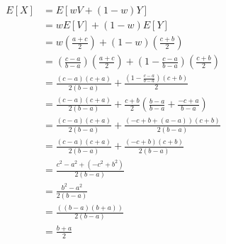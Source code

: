 \documentclass{article}
\begin{document}
\begin{enumerate}[label=\alph*)]
\begin{align*}
    E[X] &= E[wV + (1-w)Y] \\
    &= wE[V] + (1-w)E[Y] \\
    &= w\left(\frac{a + c}{2}\right) + (1-w)\left(\frac{c + b}{2}\right) \\
    &= \left(\frac{c-a}{b-a}\right) \left(\frac{a + c}{2}\right) + \left(1 - \frac{c-a}{b-a}\right) \left(\frac{c + b}{2}\right) \\
    &= \frac{(c - a)(c + a)}{2(b - a)} + \frac{(1 - \frac{c-a}{b-a})(c+b)}{2} \\
    &= \frac{(c - a)(c + a)}{2(b - a)} + \frac{c+b}{2}\left(\frac{b-a}{b-a}+\frac{-c+a}{b-a}\right) \\
    &= \frac{(c-a)(c+a)}{2(b-a)} + \frac{(-c+b+(a-a))(c+b)}{2(b-a)} \\
    &= \frac{(c-a)(c+a)}{2(b-a)} + \frac{(-c+b)(c+b)}{2(b-a)} \\
    &= \frac{c^2 - a^2 + (-c^2 + b^2)}{2(b-a)} \\
    &= \frac{b^2-a^2}{2(b-a)} \\
    &= \frac{((b-a)(b+a))}{2(b-a)} \\
    &= \frac{b+a}{2}
\end{align*}
\end{enumerate}
\end{document}
